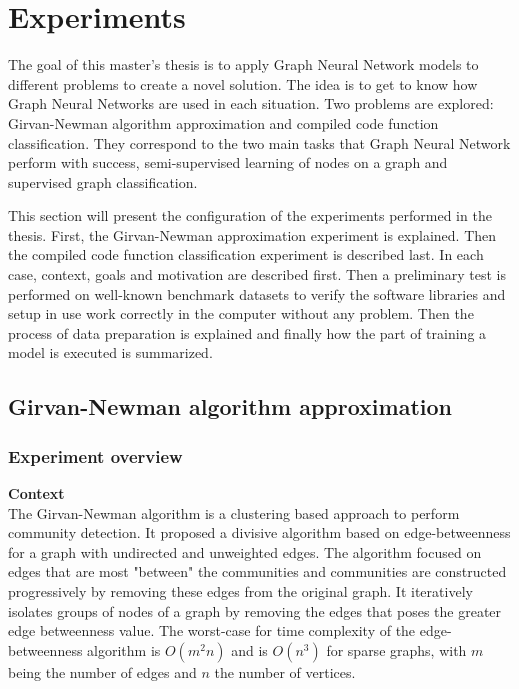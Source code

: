 \newpage
\section{Experiments}

The goal of this master's thesis is to apply Graph Neural Network models to different problems to create a novel solution. The idea is to get to know how Graph Neural Networks are used in each situation. Two problems are explored: Girvan-Newman algorithm approximation and compiled code function classification. They correspond to the two main tasks that Graph Neural Network perform with success, semi-supervised learning of nodes on a graph and supervised graph classification. 

This section will present the configuration of the experiments performed in the thesis. First, the Girvan-Newman approximation experiment is explained. Then the compiled code function classification experiment is described last. In each case, context, goals and motivation are described first. Then a preliminary test is performed on well-known benchmark datasets to verify the software libraries and setup in use work correctly in the computer without any problem. Then the process of data preparation is explained and finally how the part of training a model is executed is summarized.

\subsection{Girvan-Newman algorithm approximation}


\subsubsection{Experiment overview}

\textbf{Context} \\
The Girvan-Newman algorithm is a clustering based approach to perform community detection. It proposed a divisive algorithm based on edge-betweenness for a graph with undirected and unweighted edges. The algorithm focused on edges that are most "between" the communities and communities are constructed progressively by removing these edges from the original graph. It iteratively isolates groups of nodes of a graph by removing the edges that poses the greater edge betweenness value. The worst-case for time complexity of the edge-betweenness algorithm is $O(m^2n)$ and is $O(n^3)$ for sparse graphs, with $m$ being the number of edges and $n$ the number of vertices. 

